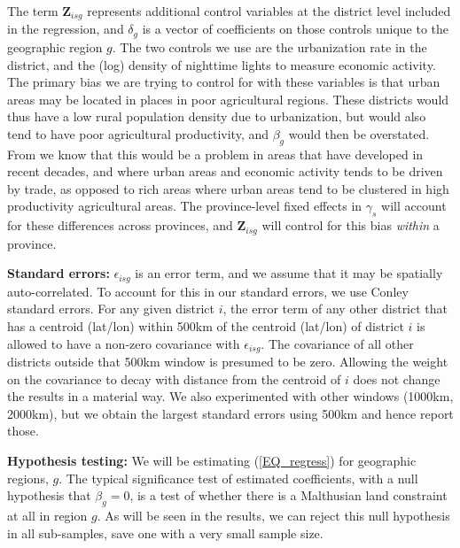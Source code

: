 \documentclass[11pt]{article}
\begin{document}
The term $\mathbf{Z}_{isg}$ represents additional control variables at the district level included in the regression, and $\delta_g$ is a vector of coefficients on those controls unique to the geographic region $g$. The two controls we use are the urbanization rate in the district, and the (log) density of nighttime lights to measure economic activity. The primary bias we are trying to control for with these variables is that urban areas may be located in places in poor agricultural regions. These districts would thus have a low rural population density due to urbanization, but would also tend to have poor agricultural productivity, and $\beta_g$ would then be overstated. From \citet{hssw2016} we know that this would be a problem in areas that have developed in recent decades, and where urban areas and economic activity tends to be driven by trade, as opposed to rich areas where urban areas tend to be clustered in high productivity agricultural areas. The province-level fixed effects in $\gamma_{s}$ will account for these differences across provinces, and $\mathbf{Z}_{isg}$ will control for this bias \textit{within} a province.

\vspace{.5cm}\noindent\textbf{Standard errors:} $\epsilon_{isg}$ is an error term, and we assume that it may be spatially auto-correlated. To account for this in our standard errors, we use Conley standard errors. For any given district $i$, the error term of any other district that has a centroid (lat/lon) within 500km of the centroid (lat/lon) of district $i$ is allowed to have a non-zero covariance with $\epsilon_{isg}$. The covariance of all other districts outside that 500km window is presumed to be zero. Allowing the weight on the covariance to decay with distance from the centroid of $i$ does not change the results in a material way. We also experimented with other windows (1000km, 2000km), but we obtain the largest standard errors using 500km and hence report those.

\vspace{.5cm}\noindent\textbf{Hypothesis testing:} We will be estimating (\ref{EQ_regress}) for geographic regions, $g$. The typical significance test of estimated coefficients, with a null hypothesis that $\beta_g=0$, is a test of whether there is a Malthusian land constraint at all in region $g$. As will be seen in the results, we can reject this null hypothesis in all sub-samples, save one with a very small sample size.
\end{document}
